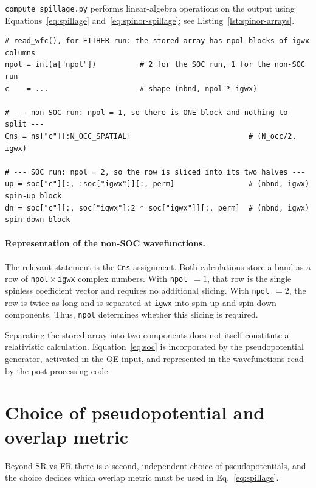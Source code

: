 \documentclass[11pt]{article}
\newcommand{\kk}{\mathbf{k}}
\begin{document}
\texttt{compute\_spillage.py} performs linear-algebra operations on the output using
Equations~\eqref{eq:spillage} and~\eqref{eq:spinor-spillage}; see Listing~\ref{lst:spinor-arrays}.

\begin{lstlisting}[caption={Treatment of SOC and non-SOC wavefunction arrays in the post-processor.
\texttt{igwx} is the number of plane waves at this $\kk$-point ($11{,}573$ at $\Gamma$).},label={lst:spinor-arrays}]
# read_wfc(), for EITHER run: the stored array has npol blocks of igwx columns
npol = int(a["npol"])          # 2 for the SOC run, 1 for the non-SOC run
c    = ...                     # shape (nbnd, npol * igwx)

# --- non-SOC run: npol = 1, so there is ONE block and nothing to split ---
Cns = ns["c"][:N_OCC_SPATIAL]                           # (N_occ/2, igwx)

# --- SOC run: npol = 2, so the row is sliced into its two halves ---
up = soc["c"][:, :soc["igwx"]][:, perm]                 # (nbnd, igwx)  spin-up block
dn = soc["c"][:, soc["igwx"]:2 * soc["igwx"]][:, perm]  # (nbnd, igwx)  spin-down block
\end{lstlisting}

\paragraph{Representation of the non-SOC wavefunctions.} The relevant statement is the
\texttt{Cns} assignment. Both calculations
store a band as a row of \texttt{npol}\,$\times$\,\texttt{igwx} complex numbers. With
\texttt{npol}~$=1$, that row is the single spinless coefficient vector and requires no additional
slicing. With \texttt{npol}~$=2$, the row is twice as long and is separated at \texttt{igwx} into
spin-up and spin-down components. Thus, \texttt{npol} determines whether this slicing is required.

\medskip
\noindent Separating the stored array into two components does not itself constitute a relativistic
calculation. Equation~\eqref{eq:soc} is incorporated by the pseudopotential generator, activated in
the QE input, and represented in the wavefunctions read by the post-processing code.

\section{Choice of pseudopotential and overlap metric}\label{sec:pp}

Beyond SR-vs-FR there is a second, independent choice of pseudopotentials, and the choice decides which overlap metric must be
used in Eq.~\eqref{eq:spillage}.
\end{document}
